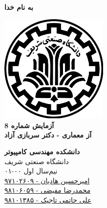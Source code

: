 \documentclass{article}
\begin{document}
\begin{titlepage}
	\begin{center}
		\textbf{ \Huge{به نام خدا}}
	
		\vspace{0.2cm}
		
		\includegraphics[width=0.4\textwidth]{sharif.png}\\
		\vspace{0.2cm}
		\textbf{ \Huge{آزمایش شماره 8}}\\
		\vspace{0.25cm}
		\textbf{ \Large{آز معماری - دکتر سربازی آزاد}}
		\vspace{0.2cm}
		
		
		\large \textbf{دانشکده مهندسی کامپیوتر}\\\vspace{0.1cm}
		\large   دانشگاه صنعتی شریف\\\vspace{0.2cm}
		\large   ﻧﯿﻢ‌سال اول ۰۰-۰۱ \\\vspace{0.10cm}
		\large{\href{mailto:a.h.hadian@gmail.com}{امیرحسین هادیان - ۹۷۱۰۲۶۰۹}}\\
		\large{\href{mailto:mofayezi.m@gmail.com}{محمدرضا مفیضی - ۹۸۱۰۶۰۵۹}}\\
		\large{\href{mailto:a.hatam008@gmail.com}{علی حاتمی تاجیک - ۹۸۱۰۱۳۸۵}}\\
	\end{center}
\end{titlepage}

\newpage

\pagestyle{fancy}
\fancyhf{}
\fancyfoot{}
\setlength{\headheight}{59pt}
\cfoot{\thepage}
\end{document}
